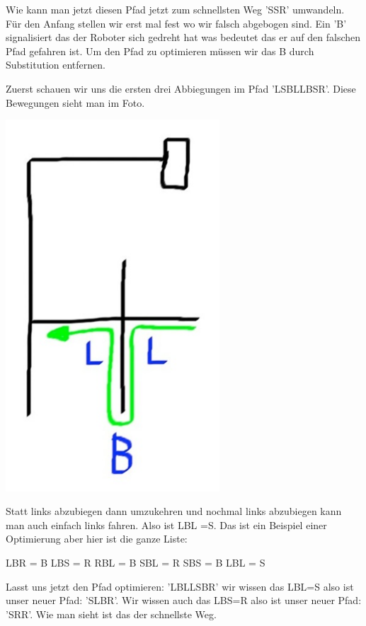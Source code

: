 \documentclass[12pt]{article}
\begin{document}
Wie kann man jetzt diesen Pfad jetzt zum schnellsten Weg 'SSR' umwandeln. Für den Anfang stellen wir erst mal fest wo wir falsch abgebogen sind. Ein 'B' signalisiert das der Roboter sich gedreht hat was bedeutet das er auf den falschen Pfad gefahren ist. Um den Pfad zu optimieren müssen wir das B durch Substitution entfernen.

Zuerst schauen wir uns die ersten drei Abbiegungen im Pfad 'LSBLLBSR'. Diese Bewegungen sieht man im Foto.

\includegraphics[width=0.6\textwidth]{images/first_three_turns.jpg}

Statt links abzubiegen dann umzukehren und nochmal links abzubiegen kann man auch einfach links fahren. Also ist LBL =S. Das ist ein Beispiel einer Optimierung aber hier ist die ganze Liste:\par
LBR = B \hspace{0.2cm} LBS = R \hspace{0.2cm} RBL = B \hspace{0.2cm} SBL = R \hspace{0.2cm}SBS = B \hspace{0.2cm} LBL = S

Lasst uns jetzt den Pfad optimieren: 'LBLLSBR' wir wissen das LBL=S also ist unser neuer Pfad: 'SLBR'. Wir wissen auch das LBS=R also ist unser neuer Pfad:  
'SRR'. Wie man sieht ist das der schnellste Weg.
\end{document}
